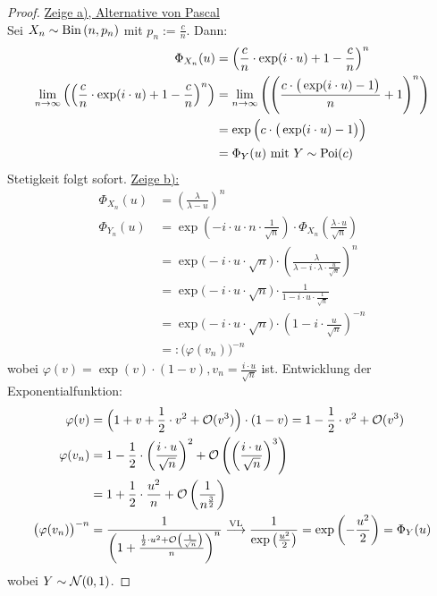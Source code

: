 \documentclass[12pt,a4paper]{article}
\begin{document}
\begin{proof}
	\underline{Zeige a), Alternative von Pascal}\\
	Sei $X_n\sim\operatorname{Bin}\left(n,p_n\right)$ mit $p_n := \frac{c}{n}$.
	Dann:
	\begin{align*}
		\Phi_{X_n}(u)
		&=\left(\frac{c}{n}\cdot\exp(i\cdot u)+1-\frac{c}{n}\right)^n\\
		\lim\limits_{n\to\infty}\left(\left(\frac{c}{n}\cdot\exp(i\cdot u)+1-\frac{c}{n}\right)^n\right)
		&=\lim\limits_{n\to\infty}\left(\left(\frac{c\cdot\big(\exp(i\cdot u)-1\big)}{n}+1\right)^n\right)\\
		&=\exp\Big(c\cdot\big(\exp(i\cdot u)-1\big)\Big)\\
		&=\Phi_Y(u)\text{ mit } Y\sim\operatorname{Poi}(c)
	\end{align*}
	Stetigkeit folgt sofort.\nl
	\underline{Zeige b):}
	\begin{align*}
		\Phi_{X_n}(u)
		&=\left(\frac{\lambda}{\lambda-u}\right)^n\\
		\Phi_{Y_n}(u)
		&=\exp\left(-i\cdot u\cdot n\cdot\frac{1}{\sqrt{n}}\right)\cdot\Phi_{X_n}\left(\frac{\lambda\cdot u}{\sqrt{n}}\right)\\
		&=\exp\big(-i\cdot u\cdot\sqrt{n})\cdot\left(\frac{\lambda}{\lambda-i\cdot\lambda\cdot\frac{u}{\sqrt{n}}}\right)^n\\
		&=\exp\big(-i\cdot u\cdot\sqrt{n}\big)\cdot\frac{1}{1-i\cdot u\cdot\frac{1}{\sqrt{n}}}\\
		&=\exp\big(-i\cdot u\cdot\sqrt{n}\big)\cdot\left(1-i\cdot\frac{u}{\sqrt{n}}\right)^{-n}\\
		&=:\big(\varphi(v_n)\big)^{-n}
	\end{align*}
	wobei $\varphi(v)=\exp(v)\cdot(1-v),v_n=\frac{i\cdot u}{\sqrt{n}}$ ist.
	Entwicklung der Exponentialfunktion:
	\begin{align*}
		\varphi(v)
		&=\Big(1+v+\frac{1}{2}\cdot v^2+\mathcal{O}(v^3)\Big)\cdot(1-v)
		=1-\frac{1}{2}\cdot v^2+\mathcal{O}(v^3)\\
		\varphi(v_n)
		&=1-\frac{1}{2}\cdot\left(\frac{i\cdot u}{\sqrt{n}}\right)^2+\mathcal{O}\left(\left(\frac{i\cdot u}{\sqrt{n}}\right)^3\right)\\
		&=1+\frac{1}{2}\cdot\frac{u^2}{n}+\mathcal{O}\left(\frac{1}{n^{\frac{3}{2}}}\right)\\
		\big(\varphi(v_n)\big)^{-n}
		&=\frac{1}{\left(1+\frac{\frac{1}{2}\cdot u^2+\mathcal{O}\left(\frac{1}{\sqrt{n}}\right)}{n}\right)^n}
		\overset{\text{VL}}{\longrightarrow}
		\frac{1}{\exp\left(\frac{u^2}{2}\right)}=\exp\left(-\frac{u^2}{2}\right)=\Phi_Y(u)
	\end{align*}
	wobei $Y\sim\mathcal{N}(0,1)$.
	
	
\end{proof}
\end{document}

